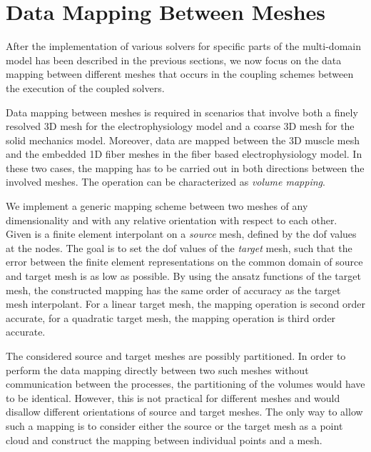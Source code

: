 
\section{Data Mapping Between Meshes}\label{sec:data_mapping_between_meshes}


After the implementation of various solvers for specific parts of the multi-domain model has been described in the previous sections, we now focus on the data mapping between different meshes that occurs in the coupling schemes between the execution of the coupled solvers. 

Data mapping between meshes is required in scenarios that involve both a finely resolved 3D mesh for the electrophysiology model and a coarse 3D mesh for the solid mechanics model. Moreover, data are mapped between the 3D muscle mesh and the embedded 1D fiber meshes in the fiber based electrophysiology model. In these two cases, the mapping has to be carried out in both directions between the involved meshes. The operation can be characterized as \emph{volume mapping}.

We implement a generic mapping scheme between two meshes of any dimensionality and with any relative orientation with respect to each other. 
Given is a finite element interpolant on a \emph{source} mesh, defined by the dof values at the nodes. The goal is to set the dof values of the \emph{target} mesh, such that the error between the finite element representations on the common domain of source and target mesh is as low as possible. By using the ansatz functions of the target mesh, the constructed mapping has the same order of accuracy as the target mesh interpolant. For a linear target mesh, the mapping operation is second order accurate, for a quadratic target mesh, the mapping operation is third order accurate.

The considered source and target meshes are possibly partitioned. In order to perform the data mapping directly between two such meshes without communication between the processes, the partitioning of the volumes would have to be identical. However, this is not practical for different meshes and would disallow different orientations of source and target meshes. The only way to allow such a mapping is to consider either the source or the target mesh as a point cloud and construct the mapping between individual points and a mesh.

